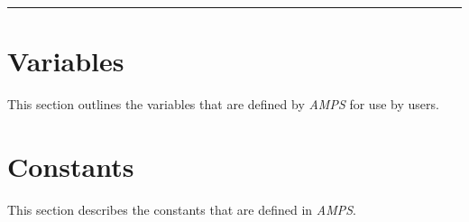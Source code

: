 

\noindent\rule{\textwidth}{1mm}

\section{Variables}
\label{Variables}

This section outlines the variables that are defined by {\em AMPS} for
use by users.  




\newpage

\section{Constants}
\label{Constants}


This section describes the constants that are defined in {\em AMPS}.


